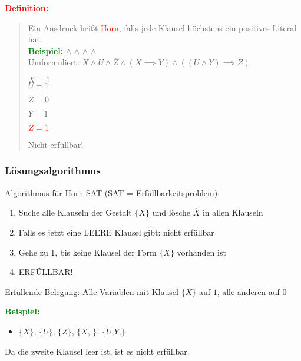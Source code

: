 \documentclass{article}
\newcommand{\red}[1]{\textcolor{red}{#1}}
\newcommand{\green}[1]{\textcolor{green}{#1}}
\newcommand{\ex}{\green{\textbf{Beispiel: }}}
\newcommand{\de}[1]{\red{\textbf{Definition: }}\begin{quote}#1\end{quote}}
\newcommand{\n}[1]{\overline{#1}}
\begin{document}
\de{
    Ein Ausdruck heißt \red{Horn}, falls jede Klausel höchstens ein positives Literal hat.\\
    \ex \underbar{X} $\land$ \underbar{U} $\land$ \underbar{$\n{Z}$} $\land$ \underbar{$(\n{X} \lor Y)$} $\land$ \underbar{$(\n{U} \lor \n{Y} \lor Z)$}\\
    Umformuliert: $X \land U \land \n{Z} \land (X \implies Y) \land ((U \land Y) \implies Z)$
    
    \begin{minipage}{2.2cm}
        \phantom{}
    \end{minipage}
    \begin{minipage}{1cm}
        $X = 1$\\
        $U = 1$
    \end{minipage}
    \begin{minipage}{1.3cm}
        $Z = 0$
    \end{minipage}
    \begin{minipage}{2.9cm}
        $Y = 1$
    \end{minipage}
    \begin{minipage}{1cm}
        \red{$Z = 1$}
    \end{minipage}

    Nicht erfüllbar!
}

\subsubsection{Lösungsalgorithmus}

Algorithmus für Horn-SAT (SAT = Erfüllbarkeitsproblem):
\begin{enumerate}
    \item Suche alle Klauseln der Gestalt $\{X\}$ und lösche $\n{X}$ in allen Klauseln
    \item Falls es jetzt eine LEERE Klausel gibt: nicht erfüllbar
    \item Gehe zu 1, bis keine Klausel der Form \(\{X\}\) vorhanden ist
    \item ERFÜLLBAR!
\end{enumerate}
Erfüllende Belegung: Alle Variablen mit Klausel \(\{X\}\) auf $1$, alle anderen auf $0$

\newpage
\ex \begin{itemize}
    \item $\{\underbar{X}\}$, $\{\underbar{U}\}$, $\{$\sout{$\n{Z}$}$\}$, $\{$\sout{$\n{X}$}, $\}$, $\{$\sout{$\n{U}$},\sout{$\n{Y}$},$\}$
\end{itemize}
Da die zweite Klausel leer ist, ist es nicht erfüllbar.
\end{document}
